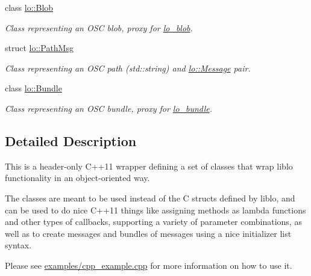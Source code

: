 \begin{DoxyCompactItemize}
class \hyperlink{classlo_1_1Blob}{lo\+::\+Blob}
\begin{DoxyCompactList}\small\item\em Class representing an O\+S\+C blob, proxy for \hyperlink{lo__types_8h_a8e780f8c09e3e4dd737fe249f11d16fc}{lo\+\_\+blob}. \end{DoxyCompactList}\item 
struct \hyperlink{structlo_1_1PathMsg}{lo\+::\+Path\+Msg}
\begin{DoxyCompactList}\small\item\em Class representing an O\+S\+C path (std\+::string) and \hyperlink{classlo_1_1Message}{lo\+::\+Message} pair. \end{DoxyCompactList}\item 
class \hyperlink{classlo_1_1Bundle}{lo\+::\+Bundle}
\begin{DoxyCompactList}\small\item\em Class representing an O\+S\+C bundle, proxy for \hyperlink{lo__types_8h_a96254950ad34e9cfbf8a6613fc74025b}{lo\+\_\+bundle}. \end{DoxyCompactList}\end{DoxyCompactItemize}


\subsection{Detailed Description}
This is a header-\/only C++11 wrapper defining a set of classes that wrap liblo functionality in an object-\/oriented way.

The classes are meant to be used instead of the C structs defined by liblo, and can be used to do nice C++11 things like assigning methods as lambda functions and other types of callbacks, supporting a variety of parameter combinations, as well as to create messages and bundles of messages using a nice initializer list syntax.

Please see \hyperlink{cpp__example_8cpp_source}{examples/cpp\+\_\+example.\+cpp} for more information on how to use it. 